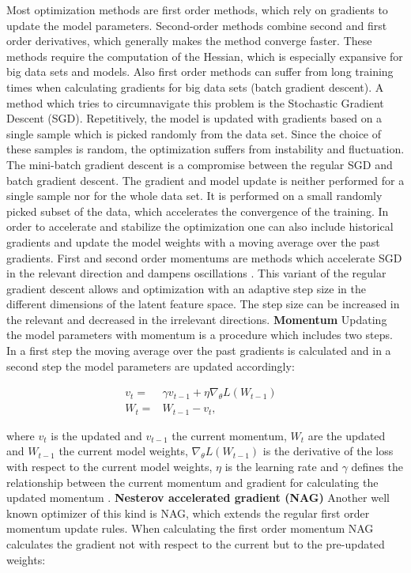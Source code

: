 Most optimization methods are first order methods, which rely on gradients to update the model parameters. Second-order methods combine second and first order derivatives, which generally makes the method converge faster. These methods require the computation of the Hessian, which is especially expansive for big data sets and models. Also first order methods can suffer from long training times when calculating gradients for big data sets (batch gradient descent). A method which tries to circumnavigate this problem is the Stochastic Gradient Descent (SGD). Repetitively, the model is updated with gradients based on a single sample which is picked randomly from the data set. Since the choice of these samples is random, the optimization suffers from instability and fluctuation. The mini-batch gradient descent is a compromise between the regular SGD and batch gradient descent. The gradient and model update is neither performed for a single sample nor for the whole data set. It is performed on a small randomly picked subset of the data, which accelerates the convergence of the training.
In order to accelerate and stabilize the optimization one can also include historical gradients and update the model weights with a moving average over the past gradients. First and second order momentums are methods which accelerate SGD in the relevant direction and dampens oscillations \cite{ShilohPerl2020}. This variant of the regular gradient descent allows and optimization with an adaptive step size in the different dimensions of the latent feature space. The step size can be increased in the relevant and decreased in the irrelevant directions.
\newline
\newline
\textbf{Momentum}
\newline
Updating the model parameters with momentum is a procedure which includes two steps. In a first step the moving average over the past gradients is calculated and in a second step the model parameters are updated accordingly:

\begin{equation}
  \begin{aligned}
      v_{t} = & \gamma v_{t-1} +  \eta \nabla_{\theta}L(W_{t-1}) &\\
      W_{t} = &W_{t-1} - v_{t},
      \label{eqn:momentum}
  \end{aligned}
\end{equation}

where $v_{t}$ is the updated and $v_{t-1}$ the current momentum, $W_{t}$ are the updated and $W_{t-1}$ the current model weights, $\nabla_{\theta}L(W_{t-1})$ is the derivative of the loss with respect to the current model weights, $\eta$ is the learning rate and $\gamma$ defines the relationship between the current momentum and gradient for calculating the updated momentum \cite{Ruder2016}.
\newline
\newline
\textbf{Nesterov accelerated gradient (NAG)}
\newline
Another well known optimizer of this kind is NAG, which extends the regular first order momentum update rules. When calculating the first order momentum NAG calculates the gradient not with respect to the current but to the pre-updated weights: 

